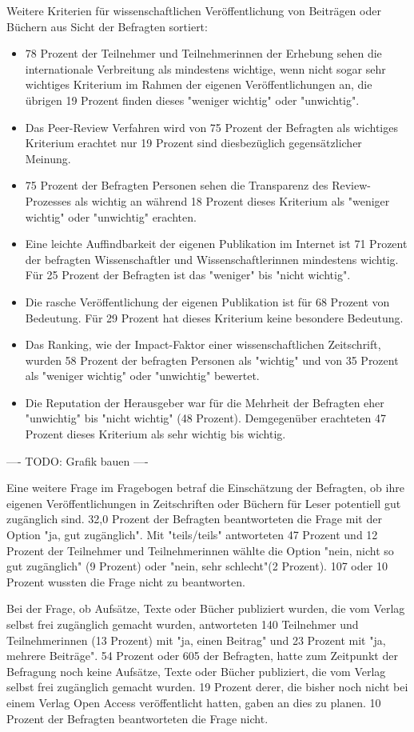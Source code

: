 Weitere Kriterien für wissenschaftlichen Veröffentlichung von Beiträgen oder Büchern aus Sicht der Befragten sortiert:
\begin{itemize}
\item 78 Prozent der Teilnehmer und Teilnehmerinnen der Erhebung sehen die internationale Verbreitung als mindestens wichtige, wenn nicht sogar sehr wichtiges Kriterium im Rahmen der eigenen Veröffentlichungen an, die übrigen 19 Prozent finden dieses "weniger wichtig" oder "unwichtig".
\item Das Peer-Review Verfahren wird von 75 Prozent der Befragten als wichtiges Kriterium erachtet nur 19 Prozent sind diesbezüglich gegensätzlicher Meinung.
\item 75 Prozent der Befragten Personen sehen die Transparenz des Review-Prozesses als wichtig an während 18 Prozent dieses Kriterium als "weniger wichtig" oder "unwichtig" erachten.
\item Eine leichte Auffindbarkeit der eigenen Publikation im Internet ist 71 Prozent der befragten Wissenschaftler und Wissenschaftlerinnen mindestens wichtig. Für 25 Prozent der Befragten ist das "weniger" bis "nicht wichtig".
\item Die rasche Veröffentlichung der eigenen Publikation ist für 68 Prozent von Bedeutung. Für 29 Prozent hat dieses Kriterium keine besondere Bedeutung.
\item Das Ranking, wie der Impact-Faktor einer wissenschaftlichen Zeitschrift, wurden 58 Prozent der befragten Personen als "wichtig" und von 35 Prozent als "weniger wichtig" oder "unwichtig" bewertet.
\item Die Reputation der Herausgeber war für die Mehrheit der Befragten eher "unwichtig" bis "nicht wichtig" (48 Prozent). Demgegenüber erachteten 47 Prozent dieses Kriterium als sehr wichtig bis wichtig.
\end{itemize}

---- TODO: Grafik bauen ----

Eine weitere Frage im Fragebogen betraf die Einschätzung der Befragten, ob ihre eigenen Veröffentlichungen in Zeitschriften oder Büchern für Leser potentiell gut zugänglich sind. 32,0 Prozent der Befragten beantworteten die Frage mit der Option "ja, gut zugänglich". Mit "teils/teils" antworteten 47 Prozent und 12 Prozent der Teilnehmer und Teilnehmerinnen wählte die Option "nein, nicht so gut zugänglich" (9 Prozent) oder "nein, sehr schlecht"(2 Prozent). 107 oder 10 Prozent wussten die Frage nicht zu beantworten.

Bei der Frage, ob Aufsätze, Texte oder Bücher publiziert wurden, die vom Verlag selbst frei zugänglich gemacht wurden, antworteten 140 Teilnehmer und Teilnehmerinnen (13 Prozent) mit "ja, einen Beitrag" und 23 Prozent mit "ja, mehrere Beiträge". 54 Prozent oder 605 der Befragten, hatte zum Zeitpunkt der Befragung noch keine Aufsätze, Texte oder Bücher publiziert, die vom Verlag selbst frei zugänglich gemacht wurden.  19 Prozent derer, die bisher noch nicht bei einem Verlag Open Access veröffentlicht hatten, gaben an dies zu planen. 10 Prozent der Befragten beantworteten die Frage nicht.

